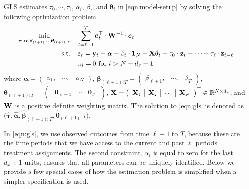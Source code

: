 		    {\blue GLS estimates $\tau_0, \cdots, \tau_\ell$, $\alpha_i$, $\beta_t$, and $\bm{\theta}_t$ in \eqref{eqn:model-setup} by solving the following optimization problem } \begin{align} \label{eqn:gls}
        \min_{\bm{\tau}, \bm{\alpha}, \bm{\beta}_{(\ell+1):T}, \bm{\theta}_{(\ell+1):T} } \quad & \sum_{t=\ell+1}^{T} \bm{e}_t^\top   \cdot \mathbf{W}^{-1} \cdot  \bm{e}_t   \\
       \nonumber \mathrm{s.t.} \quad & \bm{e}_t =  \mathbf{y}_t - \bm{\alpha} - \beta_t \cdot \bm{1}_N  - \mathbf{X} \bm{\theta}_t   - \tau_0 \cdot \mathbf{z}_t - \cdots  -  \tau_\ell \cdot \mathbf{z}_{t - \ell} \\
      \nonumber  & \alpha_i = 0 \text{ for } i > N-d_x-1 
    \end{align}
	where $\bm{\alpha} = \begin{pmatrix}
\alpha_1, &  \cdots, & \alpha_N
	\end{pmatrix} $, $\bm{\beta}_{(\ell+1):T} = \begin{pmatrix}
\beta_{\ell+1}, &  \cdots, & \beta_T
	\end{pmatrix}  $, $ \bm{\theta}_{(\ell+1):T} = \begin{pmatrix}
	\begin{array}{c|c|c}
	     \bm{\theta}_{\ell+1} &  \cdots & \bm{\theta}_T
	\end{array}
	\end{pmatrix}$, $\mathbf{X} = \begin{pmatrix}
	\begin{array}{c|c|c|c}
	     \mathbf{X}_1 & \mathbf{X}_2 & \cdots & \mathbf{X}_N
	\end{array}
	\end{pmatrix}^\top  \in \mathbb{R}^{N \times d_x}$, and $\mathbf{W}$ is a positive definite weighting matrix. The solution to \eqref{eqn:gls} is denoted as $\big(\hat{\bm{\tau}}, \hat{\bm{\alpha}}, \hat{\bm{\beta}}_{(\ell+1):T}, \hat{\bm{\theta}}_{(\ell+1):T}\big)$. {\blue In \eqref{eqn:gls}, we use observed outcomes from time $\ell+1$ to $T$, because these are the time periods that we have access to the current and past $\ell$ periods' treatment assignments. The second constraint, $\alpha_i$ is equal to zero for the last $d_x+1$ units, ensures that all parameters can be uniquely identified. Below we provide a few special cases of how the estimation problem is simplified when a simpler specification is used.
	
}
